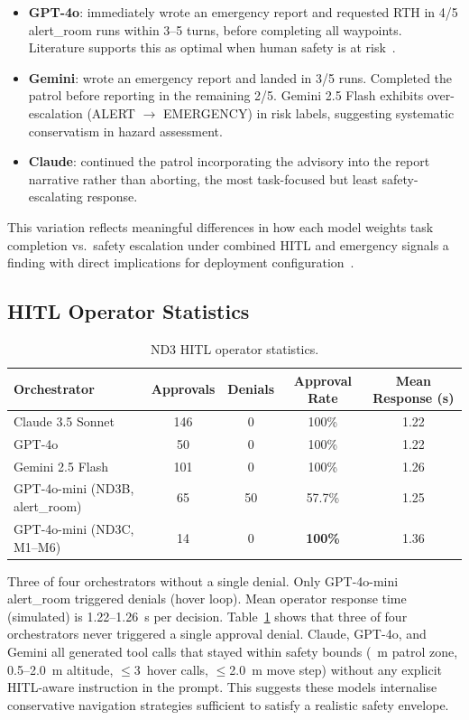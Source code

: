 \begin{itemize}
  \item \textbf{GPT-4o}: immediately wrote an emergency report and requested RTH in 4/5 alert\_room runs within 3--5 turns, before completing all waypoints.  Literature supports this as optimal when human safety is at risk~\cite{sanneman2022safeai}.

  \item \textbf{Gemini}: wrote an emergency report and landed in 3/5 runs.
  Completed the patrol before reporting in the remaining 2/5.  
  Gemini 2.5 Flash exhibits over-escalation (ALERT $\rightarrow$ EMERGENCY) in risk labels, suggesting systematic conservatism in hazard assessment.

  \item \textbf{Claude}: continued the patrol incorporating the advisory into the report narrative rather than aborting,  the most task-focused but least safety-escalating response.
\end{itemize}

This variation reflects meaningful differences in how each model weights task completion vs.\ safety escalation under combined HITL and emergency signals a finding with direct implications for deployment configuration~\cite{kapoor2024aiagents}.

\subsection{HITL Operator Statistics}
\label{sec:ch4_nd3_hitl_stats}

\begin{table}[ht]
  \caption{ND3 HITL operator statistics.}
  \label{tab:ch4_nd3_hitl}
  \centering
  \small
  \begin{tabular}{lcccc}
    \toprule
    Orchestrator & Approvals & Denials & Approval Rate & Mean Response (s) \\
    \midrule
    Claude 3.5 Sonnet & 146 & 0  & 100\% & 1.22 \\
    GPT-4o            & 50  & 0  & 100\% & 1.22 \\
    Gemini 2.5 Flash  & 101 & 0  & 100\% & 1.26 \\
    GPT-4o-mini (ND3B, alert\_room) & 65 & 50 & 57.7\% & 1.25 \\
    GPT-4o-mini (ND3C, M1--M6)     & 14 & 0  & \textbf{100\%} & 1.36 \\
    \bottomrule
  \end{tabular}
\end{table}
Three of four orchestrators  without a single denial.
Only GPT-4o-mini alert\_room triggered denials (hover loop). Mean operator response time (simulated) is 1.22--1.26~s per decision.
Table~\ref{tab:ch4_nd3_hitl} shows that three of four orchestrators never triggered a single approval denial. 
Claude, GPT-4o, and Gemini all generated tool calls that stayed within safety bounds (~m patrol zone, 0.5--2.0~m altitude, $\leq$3~hover calls, $\leq$2.0~m move step) without any explicit HITL-aware instruction in the prompt.
This suggests these models internalise conservative navigation strategies sufficient to satisfy a realistic safety envelope.

